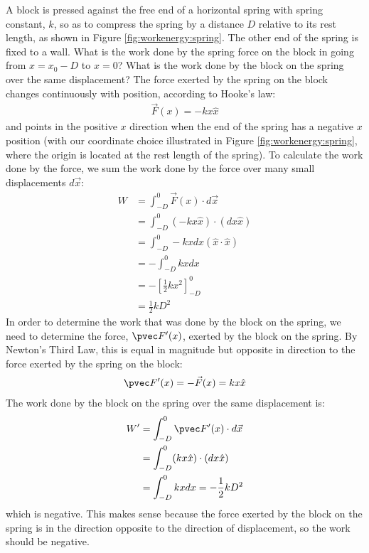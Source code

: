 \begin{example}{\label{ex:workenergy:spring} A block is pressed against the free end of a horizontal spring with spring constant, $k$, so as to compress the spring by a distance $D$ relative to its rest length, as shown in Figure \ref{fig:workenergy:spring}. The other end of the spring is fixed to a wall. What is the work done by the spring force on the block in going from $x=x_0-D$ to $x=0$? What is the work done by the block on the spring over the same displacement?
}
The force exerted by the spring on the block changes continuously with position, according to Hooke's law:
\begin{align*}
\vec F(x) = -kx \hat x
\end{align*}
and points in the positive $x$ direction when the end of the spring has a negative $x$ position (with our coordinate choice illustrated in Figure \ref{fig:workenergy:spring}, where the origin is located at the rest length of the spring). To calculate the work done by the force, we sum the work done by the force over many small displacements $d\vec x$:
\begin{align*}
W &= \int_{-D}^0 \vec F(x) \cdot d\vec x\\
&=\int_{-D}^0 (-kx \hat x) \cdot (dx \hat x)\\
&=\int_{-D}^0 -kxdx (\hat x \cdot \hat x)\\
&=-\int_{-D}^0 kx dx\\
&=-\left[\frac{1}{2}kx^2  \right]_{-D}^0\\
&=\frac{1}{2}kD^2
\end{align*}
In order to determine the work that was done by the block on the spring, we need to determine the force, $\pvec F'(x)$, exerted by the block on the spring. By Newton's Third Law, this is equal in magnitude but opposite in direction to the force exerted by the spring on the block:
\begin{align*}
\pvec F'(x) = -\vec F(x) = kx \hat x
\end{align*}
The work done by the block on the spring over the same displacement is:
\begin{align*}
W' &= \int_{-D}^0 \pvec F'(x) \cdot d\vec x\\
&=\int_{-D}^0 (kx \hat x) \cdot (dx \hat x)\\
&=\int_{-D}^0 kx dx=-\frac{1}{2}kD^2\\
\end{align*}
which is negative. This makes sense because the force exerted by the block on the spring is in the direction opposite to the direction of displacement, so the work should be negative. 
\end{example}

